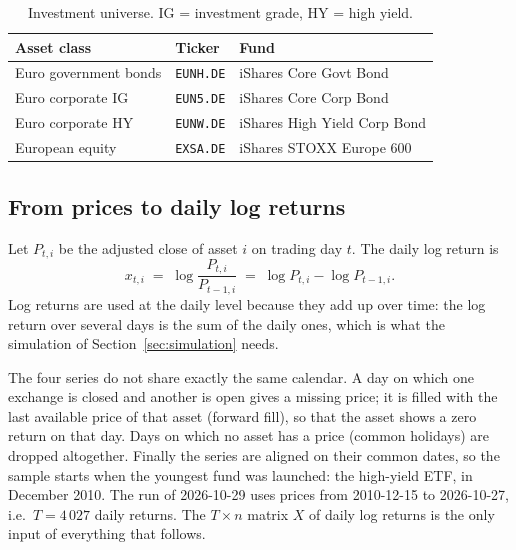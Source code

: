 \documentclass[11pt,a4paper]{article}
\newcommand{\code}[1]{\texttt{#1}}
\theoremstyle{plain}
\theoremstyle{remark}
\begin{document}
\begin{table}[htbp]
\centering
\begin{tabular}{lll}
\toprule
Asset class & Ticker & Fund \\
\midrule
Euro government bonds  & \code{EUNH.DE} & iShares Core \texteuro{} Govt Bond \\
Euro corporate IG      & \code{EUN5.DE} & iShares Core \texteuro{} Corp Bond \\
Euro corporate HY      & \code{EUNW.DE} & iShares \texteuro{} High Yield Corp Bond \\
European equity        & \code{EXSA.DE} & iShares STOXX Europe 600 \\
\bottomrule
\end{tabular}
\caption{Investment universe. IG = investment grade, HY = high yield.}
\label{tab:universe}
\end{table}

\subsection{From prices to daily log returns}

Let $P_{t,i}$ be the adjusted close of asset $i$ on trading day $t$. The
daily log return is
\begin{equation}
  x_{t,i} \;=\; \log \frac{P_{t,i}}{P_{t-1,i}} \;=\; \log P_{t,i} - \log P_{t-1,i}.
\end{equation}
Log returns are used at the daily level because they add up over time: the
log return over several days is the sum of the daily ones, which is what the
simulation of Section~\ref{sec:simulation} needs.

The four series do not share exactly the same calendar. A day on which one
exchange is closed and another is open gives a missing price; it is filled
with the last available price of that asset (forward fill), so that the
asset shows a zero return on that day. Days on which no asset has a price
(common holidays) are dropped altogether. Finally the series are aligned on
their common dates, so the sample starts when the youngest fund was
launched: the high-yield ETF, in December 2010. The run of
2026-10-29 uses prices from 2010-12-15 to 2026-10-27, i.e.\ $T = 4\,027$
daily returns.
The $T\times n$ matrix $X$ of daily log returns is the only input of
everything that follows.
\end{document}
